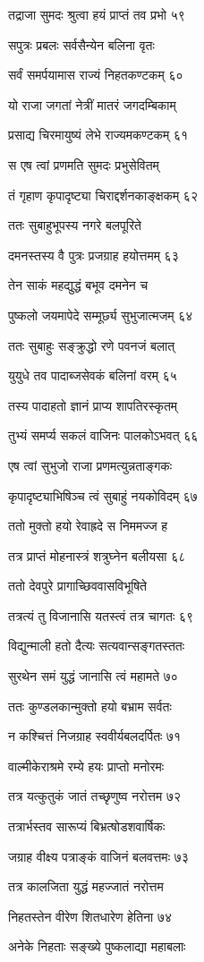 तद्राजा सुमदः श्रुत्वा हयं प्राप्तं तव प्रभो ५९

सपुत्रः प्रबलः सर्वसैन्येन बलिना वृतः

सर्वं समर्पयामास राज्यं निहतकण्टकम् ६०

यो राजा जगतां नेत्रीं मातरं जगदम्बिकाम्

प्रसाद्य चिरमायुष्यं लेभे राज्यमकण्टकम् ६१

स एष त्वां प्रणमति सुमदः प्रभुसेवितम्

तं गृहाण कृपादृष्ट्या चिराद्दर्शनकाङ्क्षकम् ६२

ततः सुबाहुभूपस्य नगरे बलपूरिते

दमनस्तस्य वै पुत्रः प्रजग्राह हयोत्तमम् ६३

तेन साकं महद्युद्धं बभूव दमनेन च

पुष्कलो जयमापेदे सम्मूर्छ्य सुभुजात्मजम् ६४

ततः सुबाहुः सङ्क्रुद्धो रणे पवनजं बलात्

युयुधे तव पादाब्जसेवकं बलिनां वरम् ६५

तस्य पादाहतो ज्ञानं प्राप्य शापतिरस्कृतम्

तुभ्यं समर्प्य सकलं वाजिनः पालकोऽभवत् ६६

एष त्वां सुभुजो राजा प्रणमत्युन्नताङ्गकः

कृपादृष्ट्याभिषिञ्च त्वं सुबाहुं नयकोविदम् ६७

ततो मुक्तो हयो रेवाह्रदे स निममज्ज ह

तत्र प्राप्तं मोहनास्त्रं शत्रुघ्नेन बलीयसा ६८

ततो देवपुरे प्रागाच्छिववासविभूषिते

तत्रत्यं तु विजानासि यतस्त्वं तत्र चागतः ६९

विद्युन्माली हतो दैत्यः सत्यवान्सङ्गतस्ततः

सुरथेन समं युद्धं जानासि त्वं महामते ७०

ततः कुण्डलकान्मुक्तो हयो बभ्राम सर्वतः

न कश्चित्तं निजग्राह स्ववीर्यबलदर्पितः ७१

वाल्मीकेराश्रमे रम्ये हयः प्राप्तो मनोरमः

तत्र यत्कुतुकं जातं तच्छृणुष्व नरोत्तम ७२

तत्रार्भस्तव सारूप्यं बिभ्रत्षोडशवार्षिकः

जग्राह वीक्ष्य पत्राङ्कं वाजिनं बलवत्तमः ७३

तत्र कालजिता युद्धं महज्जातं नरोत्तम

निहतस्तेन वीरेण शितधारेण हेतिना ७४

अनेके निहताः सङ्ख्ये पुष्कलाद्या महाबलाः

